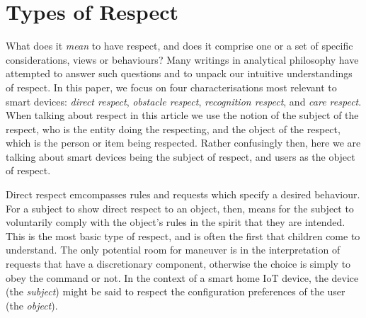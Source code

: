 \documentclass{IETpaper}
\begin{document}



\section{Types of Respect}








What does it \emph{mean} to have respect, and does it comprise one or a set of specific considerations, views or behaviours?  Many writings in analytical philosophy have attempted to answer such questions and to unpack our intuitive understandings of respect. In this paper, we focus on four characterisations most relevant to smart devices: \emph{direct respect}, \emph{obstacle respect}, \emph{recognition respect}, and \emph{care respect}. When talking about respect in this article we use the notion of the subject of the respect, who is the entity doing the respecting, and the object of the respect, which is the person or item being respected. Rather confusingly then, here we are talking about smart devices being the subject of respect, and users as the object of respect.

Direct respect emcompasses rules and requests which specify a desired behaviour. For a subject to show direct respect to an object, then, means for the subject to voluntarily comply with the object's rules in the spirit that they are intended. This is the most basic type of respect, and is often the first that children come to understand. The only potential room for maneuver is in the interpretation of requests that have a discretionary component, otherwise the choice is simply to obey the command or not. In the context of a smart home IoT device, the device (the \emph{subject}) might be said to respect the configuration preferences of the user (the \emph{object}).
\end{document}
